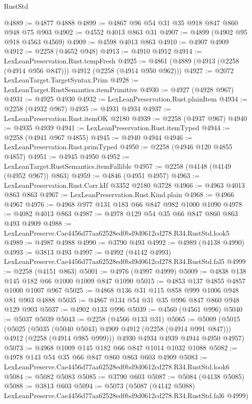 \begin{lexlean}{RustStd}
\begin{coremodule}
@4889 := @4877 @4888
@4899 := @4867 @96 @54 @31 @35 @918 @847 @860 @948 @75 @903
@4902 := @4552 @4013 @863 @31
@4907 := @4899 (@4902 @95 @918 @4563 @4569)
@4909 := @4598 @4013 @863
@4910 := @4907 @4909
@4912 := @2258 (@4652 @948)
@4913 := @4910 @4912
@4914 := LexLeanPreservation.Rust.tempFresh
@4925 := @4861 (@4889 (@4913 (@2258 (@4914 @956 @847))) @4912 (@2258 (@4914 @950 @962)))
@4927 := @2072 LexLeanTarget.TargetSyntax.Prim
@4928 := LexLeanTarget.RustSemantics.itemPrimitive
@4930 := @4927 (@4928 @967)
@4931 := @4925 @4930
@4932 := LexLeanPreservation.Rust.plainItem
@4934 := @2258 (@4932 @967)
@4935 := @4931 @4934
@4937 := LexLeanPreservation.Rust.itemOK @2180
@4939 := @2258 (@4937 @967)
@4940 := @4935 @4939
@4941 := LexLeanPreservation.Rust.itemTyped
@4944 := @2258 (@4941 @967 @4855)
@4945 := @4940 @4944
@4946 := LexLeanPreservation.Rust.primTyped
@4950 := @2258 (@4946 @120 @4855 @4857)
@4951 := @4945 @4950
@4952 := LexLeanTarget.RustSemantics.itemFallible
@4957 := @2258 (@4148 (@4149 (@4952 @967)) @863)
@4959 := @4846 (@4951 @4957)
@4963 := LexLeanPreservation.Rust.Corr.kIf @3352 @2180 @3728
@4966 := @4963 @4013 @863 @863
@4967 := LexLeanPreservation.Rust.Kind.plain
@4968 := @4966 @4967
@4976 := @4968 @977 @131 @183 @66 @847 @982 @1000 @1090
@4978 := @4082 @4013 @863
@4987 := @4978 @129 @54 @35 @66 @847 @860 @863 @493 @4909
@4988 := LexLeanPreserve.Cae4456d77aa62528ed0bd9d0612cd278.R34.RustStd.look5
@4989 := @4987 @4988
@4990 := @3790 @493
@4992 := @4989 (@4138 @4990)
@4993 := @3813 @493
@4997 := @4992 (@4142 @4993) LexLeanPreserve.Cae4456d77aa62528ed0bd9d0612cd278.R34.RustStd.fal5
@4999 := @2258 (@4151 @863)
@5001 := @4976 (@4997 @4999)
@5009 := @4838 @138 @145 @182 @66 @1000 @1009 @847 @1090
@5015 := @4853 @137 @4855 @4857 @1000 @1007 @967
@5025 := @4868 @136 @31 @115 @858 @999 @1006 @948 @81 @903 @4888
@5035 := @4867 @134 @54 @31 @35 @996 @847 @860 @948 @129 @903
@5037 := @4902 @133 @996
@5039 := @4560 (@4561 @996)
@5040 := @5037 @5039
@5043 := @2258 (@4566 @133 @31)
@5065 := @5009
    (@5015
      (@5025
        (@5035 (@5040 @5043) @4909 @4912 (@2258 (@4914 @991 @847)))
        @4912
        (@2258 (@4914 @985 @999)))
      @4930
      @4934
      @4939
      @4944
      @4950
      @4957)
@5073 := @4968 @1009 @145 @182 @66 @847 @1014 @1032 @1088
@5082 := @4978 @143 @54 @35 @66 @847 @860 @863 @603 @4909
@5083 := LexLeanPreserve.Cae4456d77aa62528ed0bd9d0612cd278.R34.RustStd.look6
@5084 := @5082 @5083
@5085 := @3790 @603
@5087 := @5084 (@4138 @5085)
@5088 := @3813 @603
@5094 := @5073
    (@5087 (@4142 @5088) LexLeanPreserve.Cae4456d77aa62528ed0bd9d0612cd278.R34.RustStd.fal6 @4999)

\end{coremodule}
\end{lexlean}
